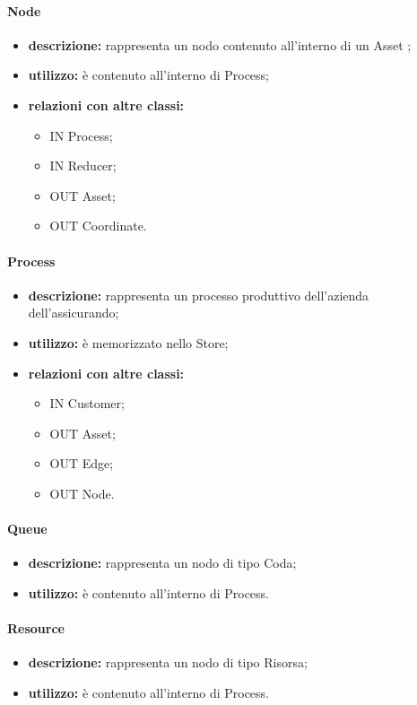 \paragraph{Node}
\begin{itemize}
	\item \textbf{descrizione:} rappresenta un nodo contenuto all'interno di un Asset ;
	\item \textbf{utilizzo:} è contenuto all'interno di Process;
	\item \textbf{relazioni con altre classi:} 
	\begin{itemize}
		\item IN Process;
		\item IN Reducer;
		\item OUT Asset;
		\item OUT Coordinate.
	\end{itemize}
\end{itemize}
\paragraph{Process}
\begin{itemize}
	\item \textbf{descrizione:} rappresenta un processo produttivo dell'azienda dell'assicurando;
	\item \textbf{utilizzo:} è memorizzato nello Store;
	\item \textbf{relazioni con altre classi:} 
	\begin{itemize}
		\item IN Customer;
		\item OUT Asset;
		\item OUT Edge;
		\item OUT Node.
	\end{itemize}
\end{itemize}
\paragraph{Queue}
\begin{itemize}
	\item \textbf{descrizione:} rappresenta un nodo di tipo Coda;
	\item \textbf{utilizzo:} è contenuto all'interno di Process.
\end{itemize}
\paragraph{Resource}
\begin{itemize}
	\item \textbf{descrizione:} rappresenta un nodo di tipo Risorsa;
	\item \textbf{utilizzo:} è contenuto all'interno di Process.
\end{itemize}
